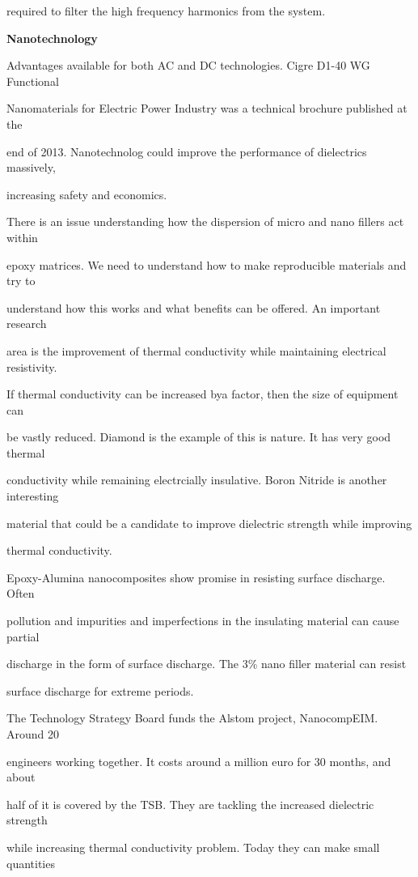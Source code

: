 required to filter the high frequency harmonics from the system.

\textbf{Nanotechnology}

Advantages available for both AC and DC technologies. Cigre D1-40 WG Functional 

Nanomaterials for Electric Power Industry was a technical brochure published at the 

end of 2013. Nanotechnolog could improve the performance of dielectrics massively, 

increasing safety and economics. 

There is an issue understanding how the dispersion of micro and nano fillers act within 

epoxy matrices. We need to understand how to make reproducible materials and try to 

understand how this works and what benefits can be offered. An important research 

area is the improvement of thermal conductivity while maintaining electrical resistivity. 

If thermal conductivity can be increased bya factor, then the size of equipment can 

be vastly reduced. Diamond is the example of this is nature. It has very good thermal 

conductivity while remaining electrcially insulative. Boron Nitride is another interesting 

material that could be a candidate to improve dielectric strength while improving 

thermal conductivity.

Epoxy-Alumina nanocomposites show promise in resisting surface discharge. Often 

pollution and impurities and imperfections in the insulating material can cause partial 

discharge in the form of surface discharge. The 3\% nano filler material can resist 

surface discharge for extreme periods.

The Technology Strategy Board funds the Alstom project, NanocompEIM. Around 20 

engineers working together. It costs around a million euro for 30 months, and about 

half of it is covered by the TSB. They are tackling the increased dielectric strength 

while increasing thermal conductivity problem. Today they can make small quantities 

